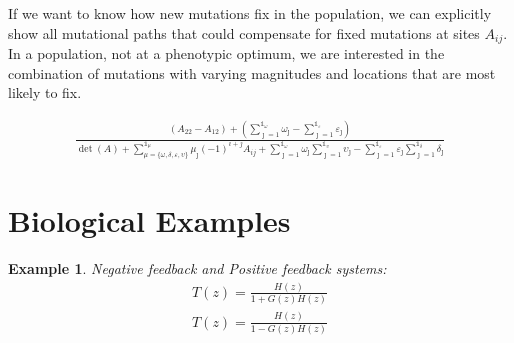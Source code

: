 \documentclass[11 pt]{article}
\newcommand{\ind}{\mathds{1}}
\newtheorem{example}{Example}
\begin{document}
  If we want to know how new mutations fix in the population, we can explicitly show all mutational paths that could compensate for fixed mutations at sites $A_{ij}$. In a population, not at a phenotypic optimum, we are interested in the combination of mutations with varying magnitudes and locations that are most likely to fix. 

  \begin{align*}
    \frac{\left(A_{22}-A_{12}\right) + \left( \displaystyle\sum_{\jmath = 1}^{\ind_{\omega}} \omega_{\jmath} - \displaystyle\sum_{\jmath = 1}^{\ind_{\varepsilon}} \varepsilon_{\jmath} \right)}{\det(A) + \displaystyle\sum_{\mu=\{\omega , \delta , \varepsilon , \upsilon \}}^{\ind_{\mu}} \mu_{\jmath} (-1)^{i+j} A_{ij} + \sum_{\jmath=1}^{\ind_{\omega}} \omega_{\jmath} \sum_{\jmath=1}^{\ind_{\upsilon}} \upsilon_{\jmath} - \sum_{\jmath=1}^{\ind_{\varepsilon}} \varepsilon_{\jmath} \sum_{\jmath=1}^{\ind_{\delta}} \delta_{\jmath} }
  \end{align*}


\section{Biological Examples}\label{sec:examples}

  \begin{example}
    Negative feedback and Positive feedback systems:
    \begin{align*}
      T(z) = \frac{H(z)}{1 + G(z)H(z)} \\
      T(z) = \frac{H(z)}{1 - G(z)H(z)} \\
    \end{align*}
  \end{example}
\end{document}
